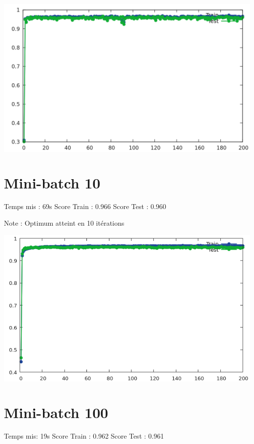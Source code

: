 \documentclass[a4paper]{article}
\begin{document}
\includegraphics[scale=0.3]{Stoch.png}

\section{Mini-batch 10}

Temps mis : 69s\newline
Score Train : 0.966\newline
Score Test : 0.960\newline

Note : Optimum atteint en 10 itérations

\includegraphics[scale=0.55]{Minibatch10.png}

\section{Mini-batch 100}

Temps mis: 19s\newline
Score Train : 0.962\newline
Score Test : 0.961\newline
\end{document}
